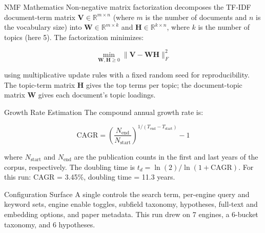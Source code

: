 \documentclass[
  ignorenonframetext,
]{beamer}
\begin{document}
\begin{frame}[allowframebreaks]{NMF Mathematics}
\protect{}\label{nmf-mathematics}
Non-negative matrix factorization decomposes the TF-IDF document-term
matrix \(\mathbf{V} \in \mathbb{R}^{m \times n}\) (where \(m\) is the
number of documents and \(n\) is the vocabulary size) into
\(\mathbf{W} \in \mathbb{R}^{m \times k}\) and
\(\mathbf{H} \in \mathbb{R}^{k \times n}\), where \(k\) is the number of
topics (here 5). The factorization minimizes:

\[
\min_{\mathbf{W}, \mathbf{H} \geq 0} \|\mathbf{V} - \mathbf{W} \mathbf{H}\|_F^2
\]

using multiplicative update rules  with a fixed
random seed for reproducibility. The topic-term matrix \(\mathbf{H}\)
gives the top terms per topic; the document-topic matrix \(\mathbf{W}\)
gives each document's topic loadings.
\end{frame}

\begin{frame}[allowframebreaks]{Growth Rate Estimation}
\protect{}\label{growth-rate-estimation}
The compound annual growth rate is:

\[
\text{CAGR} = \left(\frac{N_{\text{end}}}{N_{\text{start}}}\right)^{1/(T_{\text{end}} - T_{\text{start}})} - 1
\]

where \(N_{\text{start}}\) and \(N_{\text{end}}\) are the publication
counts in the first and last years of the corpus, respectively. The
doubling time is \(t_d = \ln(2) / \ln(1 + \text{CAGR})\). For this run:
CAGR = 3.45\%, doubling time = 11.3 years.
\end{frame}

\begin{frame}{Configuration Surface}
\protect{}\label{configuration-surface}
A single  controls the search term,
per-engine query and keyword sets, engine enable toggles, subfield
taxonomy, hypotheses, full-text and embedding options, and paper
metadata. This run drew on 7 engines, a 6-bucket taxonomy, and 6
hypotheses.
\end{frame}
\end{document}
